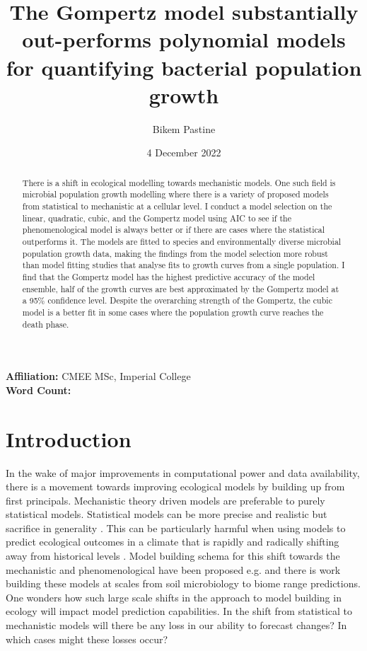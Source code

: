 \documentclass[11pt]{article}
\title{The Gompertz model substantially out-performs polynomial models for quantifying bacterial population growth}
\author{Bikem Pastine}
\date{4 December 2022}
\begin{document}
  \centering
  \maketitle
  
  \textbf{Affiliation:} CMEE MSc, Imperial College\\

  \textbf{Word Count:} 
  
   \newpage

  \begin{abstract}
    There is a shift in ecological modelling towards mechanistic models. One such field is microbial population growth modelling where there is a variety of proposed models from statistical to mechanistic at a cellular level. I conduct a model selection on the linear, quadratic, cubic, and the Gompertz model using AIC to see if the phenomenological model is always better or if there are cases where the statistical outperforms it. The models are fitted to species and environmentally diverse microbial population growth data, making the findings from the model selection more robust than model fitting studies that analyse fits to growth curves from a single population. I find that the Gompertz model has the highest predictive accuracy of the model ensemble, half of the growth curves are best approximated by the Gompertz model at a 95\% confidence level. Despite the overarching strength of the Gompertz, the cubic model is a better fit in some cases where the population growth curve reaches the death phase. 
  \end{abstract}

  \newpage

  \raggedright
  \section{Introduction}
    In the wake of major improvements in computational power and data availability, there is a movement towards improving ecological models by building up from first principals. Mechanistic theory driven models are preferable to purely statistical models. Statistical models can be more precise and realistic but sacrifice in generality \citep{10.2307/27836590}. This can be particularly harmful when using models to predict ecological outcomes in a climate that is rapidly and radically shifting away from historical levels \citep{drijfhout2015catalogue}. Model building schema for this shift towards the mechanistic and phenomenological have been proposed e.g. \citep{Harrison2021} and there is work building these models at scales from soil microbiology to biome range predictions. One wonders how such large scale shifts in the approach to model building in ecology will impact model prediction capabilities. In the shift from statistical to mechanistic models will there be any loss in our ability to forecast changes? In which cases might these losses occur?
\end{document}
